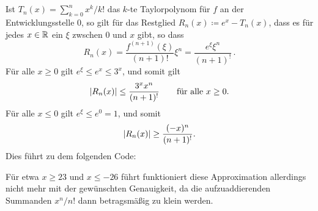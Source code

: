 \section{}

Ist $T_n(x) = \sum_{k=0}^n x^k/k!$ das $k$-te Taylorpolynom für $f$ an der Entwicklungsstelle $0$, so gilt für das Restglied $R_n(x) \coloneqq e^x - T_n(x)$, dass es für jedes $x \in \mathbb{R}$ ein $\xi$ zwschen $0$ und $x$ gibt, so dass
\[
    R_n(x)
  = \frac{f^{(n+1)}(\xi)}{(n+1)!} \xi^n
  = \frac{e^\xi \xi^n}{(n+1)^!}\,.
\]
Für alle $x \geq 0$ gilt $e^\xi \leq e^x \leq 3^x$, und somit gilt
\[
        \lvert R_n(x)\rvert
  \leq  \frac{3^x x^n}{(n+1)^!}
  \qquad
  \text{für alle $x \geq 0$}.
\]
Für alle $x \leq 0$ gilt $e^\xi \leq e^0 = 1$, und somit
\[
        \lvert R_n(x)\rvert
  \geq  \frac{(-x)^n}{(n+1)^!}.
\]
Dies führt zu dem folgenden Code:



Für etwa $x \geq 23$ und $x \leq -26$ führt funktioniert diese Approximation allerdings nicht mehr mit der gewünschten Genauigkeit, da die aufzuaddierenden Summanden $x^n/n!$ dann betragsmäßig zu klein werden.
